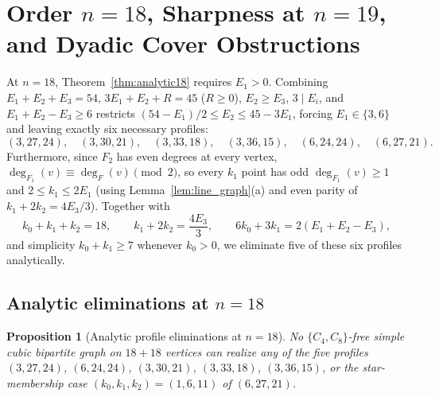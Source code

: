 \documentclass[11pt]{amsart}
\newtheorem{proposition}[theorem]{Proposition}
\theoremstyle{definition}
\theoremstyle{remark}
\begin{document}
\section{Order $n = 18$, Sharpness at $n = 19$, and Dyadic Cover Obstructions}

At $n = 18$, Theorem~\ref{thm:analytic18} requires $E_1 > 0$. Combining $E_1 + E_2 + E_3 = 54$, $3E_1 + E_2 + R = 45$ ($R \ge 0$), $E_2 \ge E_3$, $3 \mid E_i$, and $E_1 + E_2 - E_3 \ge 6$ restricts $(54 - E_1)/2 \le E_2 \le 45 - 3E_1$, forcing $E_1 \in \{3, 6\}$ and leaving exactly six necessary profiles:
\[
(3,27,24),\quad (3,30,21),\quad (3,33,18),\quad (3,36,15),\quad (6,24,24),\quad (6,27,21).
\]
Furthermore, since $F_2$ has even degrees at every vertex, $\deg_{F_1}(v) \equiv \deg_F(v) \pmod 2$, so every $k_1$ point has odd $\deg_{F_1}(v) \ge 1$ and $2 \le k_1 \le 2E_1$ (using Lemma~\ref{lem:line_graph}(a) and even parity of $k_1 + 2k_2 = 4E_3/3$). Together with
\[
k_0 + k_1 + k_2 = 18,\qquad k_1 + 2k_2 = \frac{4E_3}{3},\qquad 6k_0 + 3k_1 = 2(E_1 + E_2 - E_3),
\]
and simplicity $k_0 + k_1 \ge 7$ whenever $k_0 > 0$, we eliminate five of these six profiles analytically.

\subsection{Analytic eliminations at $n = 18$}

\begin{proposition}[Analytic profile eliminations at $n=18$]\label{prop:n18_analytic}
No $\{C_4, C_8\}$-free simple cubic bipartite graph on $18 + 18$ vertices can realize any of the five profiles $(3,27,24)$, $(6,24,24)$, $(3,30,21)$, $(3,33,18)$, $(3,36,15)$, or the star-membership case $(k_0, k_1, k_2) = (1, 6, 11)$ of $(6,27,21)$.
\end{proposition}
\end{document}
